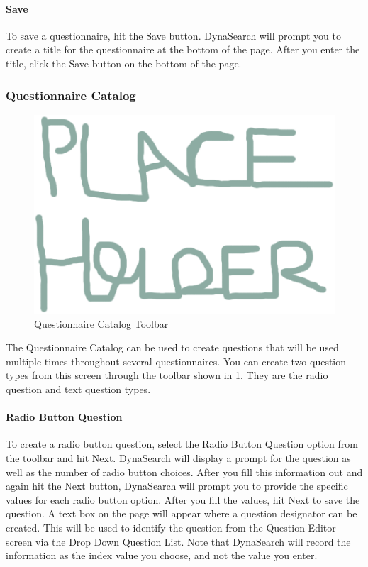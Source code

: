 \documentclass[article]{ij4uq}              %
\begin{document}
\paragraph{Save}
To save a questionnaire, hit the Save button. DynaSearch will prompt you to create a title for the questionnaire at the bottom of the page. After you enter the title, click the Save button on the bottom of the page.

\subsubsection{Questionnaire Catalog}

\begin{figure}[h!]
 \centering
 \includegraphics[width=5.0in]{figures/place.eps}
 \caption{Questionnaire Catalog Toolbar}
 \label{fig:questCatTool}
\end{figure}
\FloatBarrier

The Questionnaire Catalog can be used to create questions that will be used multiple times throughout several questionnaires. You can create two question types from this screen through the toolbar shown in \ref{fig:questCatTool}. They are the radio question and text question types.

\paragraph{Radio Button Question}
To create a radio button question, select the Radio Button Question option from the toolbar and hit Next. DynaSearch will display a prompt for the question as well as the number of radio button choices. After you fill this information out and again hit the Next button, DynaSearch will prompt you to provide the specific values for each radio button option. 
After you fill the values, hit Next to save the question. A text box on the page will appear where a question designator can be created. This will be used to identify the question from the Question Editor screen via the Drop Down Question List. 
Note that DynaSearch will record the information as the index value you choose, and not the value you enter.
\end{document}
